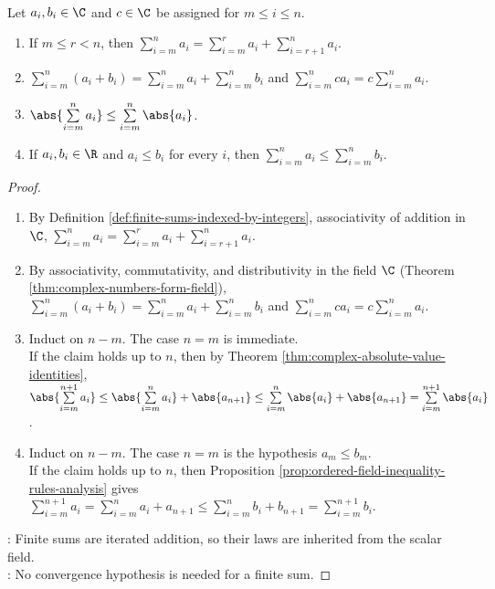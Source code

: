 \begin{proposition} \label{prop:finite-sum-basic-laws} \\
Let $a_i,b_i\in\C$ and $c\in\C$ be assigned for $m\leq i\leq n$.
\begin{enumerate}[label=(\roman*)]
\setlength{\itemsep}{0pt}
\item If $m\leq r<n$, then $\sum\limits_{i=m}^{n}a_i=\sum\limits_{i=m}^{r}a_i+\sum\limits_{i=r+1}^{n}a_i$.
\item $\sum\limits_{i=m}^{n}(a_i+b_i)=\sum\limits_{i=m}^{n}a_i+\sum\limits_{i=m}^{n}b_i$ and $\sum\limits_{i=m}^{n}ca_i=c\sum\limits_{i=m}^{n}a_i$.
\item $\abs{\sum\limits_{i=m}^{n}a_i}\leq\sum\limits_{i=m}^{n}\abs{a_i}$.
\item If $a_i,b_i\in\R$ and $a_i\leq b_i$ for every $i$, then $\sum\limits_{i=m}^{n}a_i\leq\sum\limits_{i=m}^{n}b_i$.
\end{enumerate}
\begin{proof}
\begin{enumerate}[label=(\roman*)]
\setlength{\itemsep}{0pt}
\item By Definition \ref{def:finite-sums-indexed-by-integers}, associativity of addition in $\C$, $\sum\limits_{i=m}^{n}a_i=\sum\limits_{i=m}^{r}a_i+\sum\limits_{i=r+1}^{n}a_i$.
\item By associativity, commutativity, and distributivity in the field $\C$ (Theorem \ref{thm:complex-numbers-form-field}),\\
$\sum\limits_{i=m}^{n}(a_i+b_i)=\sum\limits_{i=m}^{n}a_i+\sum\limits_{i=m}^{n}b_i$ and $\sum\limits_{i=m}^{n}ca_i=c\sum\limits_{i=m}^{n}a_i$.
\item Induct on $n-m$. The case $n=m$ is immediate.\\
If the claim holds up to $n$, then by Theorem \ref{thm:complex-absolute-value-identities}, $\abs{\sum\limits_{i=m}^{n+1}a_i} \leq \abs{\sum\limits_{i=m}^{n}a_i}+\abs{a_{n+1}} \leq \sum\limits_{i=m}^{n}\abs{a_i}+\abs{a_{n+1}} =\sum\limits_{i=m}^{n+1}\abs{a_i}$.
\item Induct on $n-m$. The case $n=m$ is the hypothesis $a_m\leq b_m$.\\
If the claim holds up to $n$, then Proposition \ref{prop:ordered-field-inequality-rules-analysis} gives $\sum\limits_{i=m}^{n+1}a_i =\sum\limits_{i=m}^{n}a_i+a_{n+1} \leq \sum\limits_{i=m}^{n}b_i+b_{n+1} =\sum\limits_{i=m}^{n+1}b_i$.
\end{enumerate}
: Finite sums are iterated addition, so their laws are inherited from the scalar field.\\
: No convergence hypothesis is needed for a finite sum.
\end{proof}
\end{proposition}

